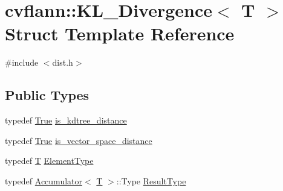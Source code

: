 \hypertarget{structcvflann_1_1KL__Divergence}{\section{cvflann\-:\-:K\-L\-\_\-\-Divergence$<$ T $>$ Struct Template Reference}
\label{structcvflann_1_1KL__Divergence}
}


{\ttfamily \#include $<$dist.\-h$>$}

\subsection*{Public Types}
\begin{DoxyCompactItemize}
\item 
typedef \hyperlink{classcvflann_1_1True}{True} \hyperlink{structcvflann_1_1KL__Divergence_a76ae60a1f10787287d1cdf58bb1f2837}{is\-\_\-kdtree\-\_\-distance}
\item 
typedef \hyperlink{classcvflann_1_1True}{True} \hyperlink{structcvflann_1_1KL__Divergence_a97aacbeceba731095e7b303fa9a2d60b}{is\-\_\-vector\-\_\-space\-\_\-distance}
\item 
typedef \hyperlink{calib3d_8hpp_a3efb9551a871ddd0463079a808916717}{T} \hyperlink{structcvflann_1_1KL__Divergence_abd41c2b26ab04092a777edbc538f13b7}{Element\-Type}
\item 
typedef \hyperlink{structcvflann_1_1Accumulator}{Accumulator}$<$ \hyperlink{calib3d_8hpp_a3efb9551a871ddd0463079a808916717}{T} $>$\-::Type \hyperlink{structcvflann_1_1KL__Divergence_adc6bd17c29d9bc0ecea2210dbc47b91a}{Result\-Type}
\end{DoxyCompactItemize}
